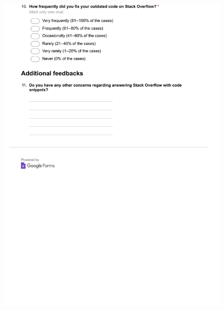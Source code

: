 \documentclass{svjour3}                     %
\begin{document}
\begin{figure}[H]
	\centering
	\includegraphics[width=0.9\linewidth]{answerer-4}
	\label{fig:answerer-4}
\end{figure}

%
%
%
\end{document}
